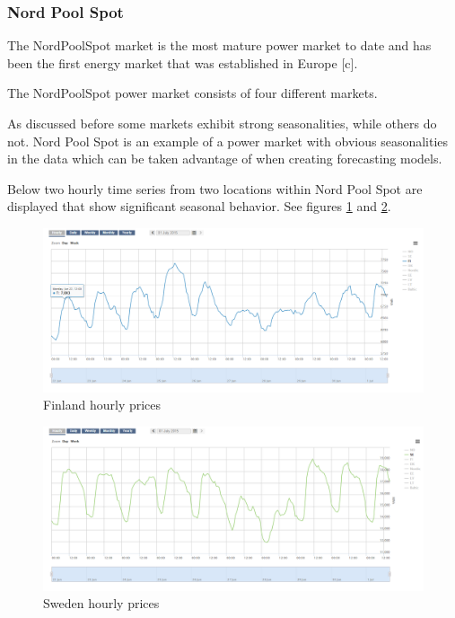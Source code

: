 \subsubsection{Nord Pool Spot}


The NordPoolSpot market is the most mature power market to date and has been the first energy market that was established in Europe [c]. 

The NordPoolSpot power market consists of four different markets. %






As discussed before some markets exhibit strong seasonalities, while others do not. Nord Pool Spot is an example of a power market with obvious seasonalities in the data which can be taken advantage of when creating forecasting models. 

Below two hourly time series from two locations within Nord Pool Spot are displayed that show significant seasonal behavior. 
See figures \ref{fig:hourly_prices_finland} and \ref{fig:hourly_prices_sweden}.

\begin{figure}[!h]
	\centering
		\includegraphics[width=1.00\textwidth]{figures/methodology/hourly_prices_finland.PNG}
	\caption{Finland hourly prices}
	\label{fig:hourly_prices_finland}
\end{figure}

\begin{figure}[!h]
	\centering
		\includegraphics[width=1.00\textwidth]{figures/methodology/hourly_prices_sweden.PNG}
	\caption{Sweden hourly prices}
	\label{fig:hourly_prices_sweden}
\end{figure}




